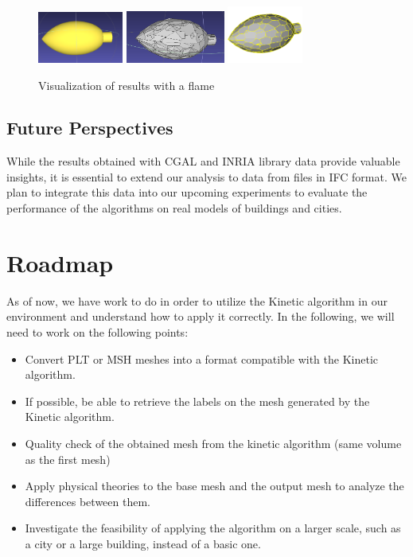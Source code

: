 \documentclass{article}
\begin{document}
\begin{figure}[h]
    \centering
    \includegraphics[width=0.25\textwidth]{../../images/screen_kinetic/flame_point.png}
    \hspace{0.05\textwidth}
    \includegraphics[width=0.29\textwidth]{../../images/screen_kinetic/flame_cgal.png}
    \hspace{0.05\textwidth}
    \includegraphics[width=0.22\textwidth]{../../images/screen_kinetic/flame_inria.png}
    \caption{Visualization of results with a flame}
    \end{figure}

\subsection*{Future Perspectives}

    While the results obtained with CGAL and INRIA library data provide valuable insights, it is essential to extend our analysis to data from files in IFC format. We plan to integrate this data into our upcoming experiments to evaluate the performance of the algorithms on real models of buildings and cities.
    
\section{Roadmap}
As of now, we have work to do in order to utilize the Kinetic algorithm in our environment 
and understand how to apply it correctly. In the following, we will need to work on the following points:
\begin{itemize}
  \item Convert PLT or MSH meshes into a format compatible with the Kinetic algorithm.
  \item If possible, be able to retrieve the labels on the mesh generated by the Kinetic algorithm.
  \item Quality check of the obtained mesh from the kinetic algorithm (same volume as the first mesh)
  \item Apply physical theories to the base mesh and the output mesh to analyze the differences between them.
  \item Investigate the feasibility of applying the algorithm on a larger scale, such as a city or a large building, instead of a basic one.
\end{itemize}
\end{document}
